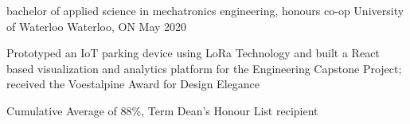 
\begin{cventries}
  \cventry
    {bachelor of applied science in mechatronics engineering, honours co-op} %
    {University of Waterloo} %
    {Waterloo, ON} %
    {May 2020} %
    {
      \begin{cvitems} %
          \vspace{1.0mm}
          \item {Prototyped an IoT parking device using LoRa Technology and built a React based visualization and analytics platform for the Engineering Capstone Project; received the Voestalpine Award for Design Elegance}
          \vspace{1.0mm}
          \item {Cumulative Average of 88\%, Term Dean's Honour List recipient}
      \end{cvitems}
    }
\end{cventries}
